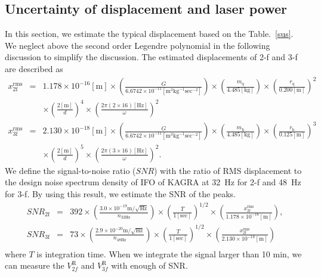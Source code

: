 \documentclass[A4]{spie}  %
\begin{document}
\subsection{Uncertainty of displacement and  laser power}
In this section, we estimate the typical displacement based on the Table.~\ref{sus}. We neglect above the second order Legendre polynomial in the following discussion to simplify the discussion. 
 The estimated displacements of 2-f and 3-f are described as
\begin{eqnarray}
x^{\mathrm{rms}}_{\mathrm{2f}}&=&1.178 \times 10^{-16}\mathrm{[m]} \times \left( \frac{G}{6.6742 \times 10^{-11} \mathrm{[m^3kg^{-1}sec^{-2}]}} \right) \times \left( \frac{m_{\mathrm{q}}}{4.485 \mathrm{[kg]}} \right) \times \left( \frac{r_{\mathrm{q}}}{0.200 \mathrm{[m]}} \right)^2 \nonumber \\
 &&\times \left( \frac{2\mathrm{[m]}}{d} \right)^4 \times \left( \frac{2\pi(2\times 16)\mathrm{[Hz]}}{\omega} \right)^2\\
x^{\mathrm{rms}}_{\mathrm{3f}}&=&2.130 \times 10^{-18}\mathrm{[m]} \times \left( \frac{G}{6.6742 \times 10^{-11} \mathrm{[m^3kg^{-1}sec^{-2}]}} \right) \times \left( \frac{m_{\mathrm{h}}}{4.485 \mathrm{[kg]}} \right) \times \left( \frac{r_{\mathrm{h}}}{0.125 \mathrm{[m]}} \right)^3 \nonumber \\
 &&\times \left( \frac{2\mathrm{[m]}}{d} \right)^5 \times \left( \frac{2\pi(3\times 16)\mathrm{[Hz]}}{\omega} \right)^2.
\end{eqnarray}
We define the signal-to-noise ratio ($\!S\!N\!R$) with the ratio of RMS displacement to the design noise spectrum density of IFO of KAGRA at 32~Hz for 2-f and 48~Hz for 3-f.
By using this result, we estimate the SNR of the peaks.
\begin{eqnarray}
\!S\!N\!R_{\mathrm{2f}}&=&392 \times \left(\frac{3.0 \times 10^{-19} \mathrm{m/\sqrt{Hz}}}{n_{\mathrm{32Hz}}} \right) \times \left(\frac{T}{1 [\mathrm{sec}]} \right)^{1/2} \times \left(\frac{x_{\mathrm{2f}}^{\mathrm{rms}}}{1.178 \times 10^{-16}\mathrm{[m]} }  \right),   \\
\!S\!N\!R_{\mathrm{3f}}&=&73 \times \left(\frac{2.9 \times 10^{-20} \mathrm{m/\sqrt{Hz}}}{n_{\mathrm{48Hz}}} \right) \times \left(\frac{T}{1 [\mathrm{sec}]} \right)^{1/2} \times \left(\frac{x_{\mathrm{2f}}^{\mathrm{rms}}}{2.130 \times 10^{-18}\mathrm{[m] }} \right)   \\
\end{eqnarray}
where $T$ is integration time. When we integrate the signal larger than 10 min, we can measure the $V^{\mathrm{R}}_{2f}$ and $V^{\mathrm{R}}_{3f}$ with enough of SNR.
\end{document}
